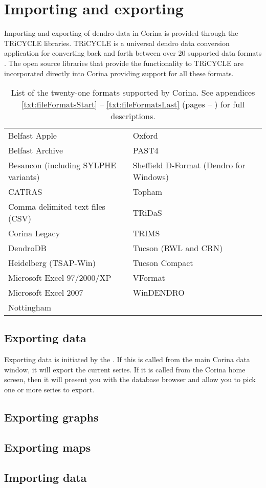 \chapter{Importing and exporting}
\label{txt:importExport}
Importing and exporting of dendro data in Corina is provided through the TRiCYCLE libraries.  TRiCYCLE is a universal dendro data conversion application for converting back and forth between over 20 supported data formats \citep{tricycle}.  The open source libraries that provide the functionality to TRiCYCLE are incorporated directly into Corina providing support for all these formats.  

\begin{table*}[htbp]
\centering
\label{txt:formatList}
\begin{tabular*}{0.8\textwidth}{ll}
\toprule
Belfast Apple & Oxford \\
Belfast Archive & PAST4\\
Besancon (including SYLPHE variants) &  Sheffield D-Format (Dendro for Windows)\\
CATRAS & Topham \\
Comma delimited text files (CSV) &  TRiDaS\\
Corina Legacy &  TRIMS\\
DendroDB & Tucson (RWL and CRN)\\
Heidelberg (TSAP-Win) &  Tucson Compact\\
Microsoft Excel 97/2000/XP&  VFormat\\
Microsoft Excel 2007 & WinDENDRO\\
Nottingham &  \\
\bottomrule
\end{tabular*}
\caption{List of the twenty-one formats supported by Corina. See appendices \ref{txt:fileFormatsStart} -- \ref{txt:fileFormatsLast} (pages \pageref{txt:fileFormatsStart} -- \pageref{txt:fileFormatsEnd}) for full descriptions.}
\end{table*}



\section{Exporting data}
Exporting data is initiated by the .  If this is called from the main Corina data window, it will export the current series.  If it is called from the Corina home screen, then it will present you with the database browser and allow you to pick one or more series to export.


\section{Exporting graphs}



\section{Exporting maps}


\section{Importing data}
